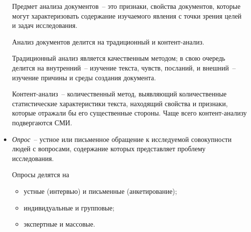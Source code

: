 \begin{itemize}
      Предмет анализа документов~-- это признаки, свойства документов, которые
      могут характеризовать содержание изучаемого явления с точки зрения целей
      и задач исследования.

      Анализ документов делится на традиционный и контент-анализ.

      Традиционный анализ является качественным методом; в свою очередь делится
      на внутренний~-- изучение текста, чувств, посланий, и внешний~-- изучение
      причины и среды создания документа.

      Контент-анализ~-- количественный метод, выявляющий количественные
      статистические характеристики текста, находящий свойства и признаки,
      которые отражали бы его существенные стороны. Чаще всего контент-анализу
      подвергаются СМИ.

    \item \emph{Опрос}~-- устное или письменное обращение к исследуемой
      совокупности людей с вопросами, содержание которых представляет проблему
      исследования.

      Опросы делятся на
      \begin{itemize}
        \item устные (интервью) и письменные (анкетирование);
        \item индивидуальные и групповые;
        \item экспертные и массовые.
      \end{itemize}
  \end{itemize}
